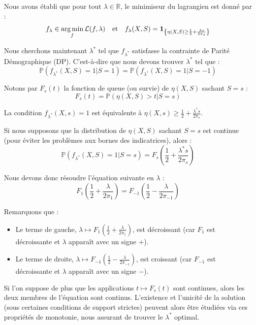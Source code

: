 \begin{remarque}
    Nous avons établi que pour tout $\lambda \in \mathbb{R}$, le minimiseur du lagrangien est donné par :
    \[
    f_\lambda \in \operatorname*{arg\,min}_f \mathcal{L}(f, \lambda) \quad \text{et} \quad f_\lambda(X,S) = \mathbf{1}_{\left\{\eta(X,S) \ge \frac{1}{2} + \frac{\lambda s}{2\pi_s}\right\}}
    \]
    
    Nous cherchons maintenant $\lambda^*$ tel que $f_{\lambda^*}$ satisfasse la contrainte de Parité Démographique (DP). C'est-à-dire que nous devons trouver $\lambda^*$ tel que :
    \[
    \mathbb{P}(f_{\lambda^*}(X,S)=1 | S=1) = \mathbb{P}(f_{\lambda^*}(X,S)=1 | S=-1)
    \]
    
    Notons par $F_s(t)$ la fonction de queue (ou survie) de $\eta(X,S)$ sachant $S=s$ :
    \[
    F_s(t) = \mathbb{P}(\eta(X,S) > t | S=s)
    \]
    
    La condition $f_{\lambda^*}(X,s) = 1$ est équivalente à $\eta(X,s) \ge \frac{1}{2} + \frac{\lambda^* s}{2\pi_s}$.
    
    Si nous supposons que la distribution de $\eta(X,S)$ sachant $S=s$ est continue (pour éviter les problèmes aux bornes des indicatrices), alors :
    \[
    \mathbb{P}(f_{\lambda^*}(X,S)=1 | S=s) = F_s\left(\frac{1}{2} + \frac{\lambda^* s}{2\pi_s}\right)
    \]
    
    Nous devons donc résoudre l'équation suivante en $\lambda$ :
    \[
    F_1\left(\frac{1}{2} + \frac{\lambda}{2\pi_1}\right) = F_{-1}\left(\frac{1}{2} - \frac{\lambda}{2\pi_{-1}}\right)
    \]
    
    Remarquons que :
    \begin{itemize}
        \item Le terme de gauche, $\lambda \mapsto F_1\left(\frac{1}{2} + \frac{\lambda}{2\pi_1}\right)$, est décroissant (car $F_1$ est décroissante et $\lambda$ apparaît avec un signe $+$).
        \item Le terme de droite, $\lambda \mapsto F_{-1}\left(\frac{1}{2} - \frac{\lambda}{2\pi_{-1}}\right)$, est croissant (car $F_{-1}$ est décroissante et $\lambda$ apparaît avec un signe $-$).
    \end{itemize}
    
    Si l'on suppose de plus que les applications $t \mapsto F_s(t)$ sont continues, alors les deux membres de l'équation sont continus. L'existence et l'unicité de la solution (sous certaines conditions de support strictes) peuvent alors être étudiées via ces propriétés de monotonie, nous assurant de trouver le $\lambda^*$ optimal.
\end{remarque}


